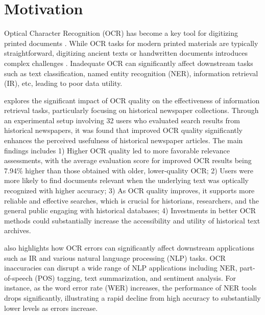 \label{chap:1_intro}
\section{Motivation}
\label{sec:1_motivation}
Optical Character Recognition (OCR) has become a key tool for digitizing printed documents \citep{singh2012survey}. While OCR tasks for modern printed materials are typically straightforward, digitizing ancient texts or handwritten documents introduces complex challenges \citep{neudecker2019ocr}. Inadequate OCR can significantly affect downstream tasks such as text classification, named entity recognition (NER), information retrieval (IR), etc, leading to poor data utility. 

\cite{kettunen2022ocr} explores the significant impact of OCR quality on the effectiveness of information retrieval tasks, particularly focusing on historical newspaper collections. Through an experimental setup involving 32 users who evaluated search results from historical newspapers, it was found that improved OCR quality significantly enhances the perceived usefulness of historical newspaper articles. The main findings includes 1) Higher OCR quality led to more favorable relevance assessments, with the average evaluation score for improved OCR results being 7.94\% higher than those obtained with older, lower-quality OCR; 2) Users were more likely to find documents relevant when the underlying text was optically recognized with higher accuracy; 3) As OCR quality improves, it supports more reliable and effective searches, which is crucial for historians, researchers, and the general public engaging with historical databases; 4) Investments in better OCR methods could substantially increase the accessibility and utility of historical text archives.

\cite{nguyen2021survey} also highlights how OCR errors can significantly affect downstream applications such as IR and various natural language processing (NLP) tasks. OCR inaccuracies can disrupt a wide range of NLP applications including NER, part-of-speech (POS) tagging, text summarization, and sentiment analysis. For instance, as the word error rate (WER) increases, the performance of NER tools drops significantly, illustrating a rapid decline from high accuracy to substantially lower levels as errors increase. 


